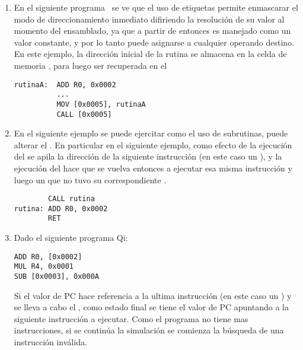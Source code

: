 \begin{enumerate}

\item En el siguiente programa \qi\ se ve que el uso de etiquetas permite enmascarar el modo de direccionamiento inmediato difiriendo la resolución de su valor al momento del ensamblado, ya que a partir de entonces es manejado como un valor constante, y por lo tanto puede asignarse a cualquier operando destino. En este ejemplo, la dirección inicial de la rutina  se almacena en la celda de memoria , para luego ser recuperada en el 

\begin{verbatim}
rutinaA:  ADD R0, 0x0002 
          ...
          MOV [0x0005], rutinaA
          CALL [0x0005] 
\end{verbatim}

\item En el siguiente ejemplo se puede ejercitar como el uso de subrutinas, puede alterar el \ciclo. En particular en el siguiente ejemplo, como efecto de la ejecución del  se apila la dirección de la siguiente instrucción (en este caso un ), y la ejecución del  hace que se vuelva entonces a ejecutar esa misma instrucción y luego un  que no tuvo su correspondiente .

\begin{verbatim}
        CALL rutina 
rutina: ADD R0, 0x0002 
        RET 
\end{verbatim}



\item Dado el siguiente programa Qi:

\begin{verbatim}
ADD R0, [0x0002]
MUL R4, 0x0001
SUB [0x0003], 0x000A 
\end{verbatim}

Si el valor de PC hace referencia a la ultima instrucción (en este caso un ) y se lleva a cabo el \ciclo, como estado final se tiene el valor de PC apuntando a la siguiente instrucción a ejecutar. Como el programa no tiene mas instrucciones, si se continúa la simulación se comienza la búsqueda de una instrucción inválida.

\end{enumerate} 



